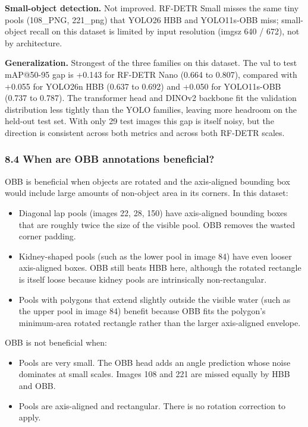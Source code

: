 \documentclass[11pt
]{article}
\providecommand{\tightlist}{%
  \setlength{\itemsep}{0pt}\setlength{\parskip}{0pt}}
\begin{document}
\textbf{Small-object detection.} Not improved. RF-DETR Small misses the
same tiny pools (108\_PNG, 221\_png) that YOLO26 HBB and YOLO11s-OBB
miss; small-object recall on this dataset is limited by input resolution
(imgsz 640 / 672), not by architecture.

\textbf{Generalization.} Strongest of the three families on this
dataset. The val to test mAP@50-95 gap is +0.143 for RF-DETR Nano (0.664
to 0.807), compared with +0.055 for YOLO26n HBB (0.637 to 0.692) and
+0.050 for YOLO11s-OBB (0.737 to 0.787). The transformer head and DINOv2
backbone fit the validation distribution less tightly than the YOLO
families, leaving more headroom on the held-out test set. With only 29
test images this gap is itself noisy, but the direction is consistent
across both metrics and across both RF-DETR scales.

\subsubsection{8.4 When are OBB annotations
beneficial?}\label{when-are-obb-annotations-beneficial}

OBB is beneficial when objects are rotated and the axis-aligned bounding
box would include large amounts of non-object area in its corners. In
this dataset:

\begin{itemize}
\tightlist
\item
  Diagonal lap pools (images 22, 28, 150) have axis-aligned bounding
  boxes that are roughly twice the size of the visible pool. OBB removes
  the wasted corner padding.
\item
  Kidney-shaped pools (such as the lower pool in image 84) have even
  looser axis-aligned boxes. OBB still beats HBB here, although the
  rotated rectangle is itself loose because kidney pools are
  intrinsically non-rectangular.
\item
  Pools with polygons that extend slightly outside the visible water
  (such as the upper pool in image 84) benefit because OBB fits the
  polygon's minimum-area rotated rectangle rather than the larger
  axis-aligned envelope.
\end{itemize}

OBB is not beneficial when:

\begin{itemize}
\tightlist
\item
  Pools are very small. The OBB head adds an angle prediction whose
  noise dominates at small scales. Images 108 and 221 are missed equally
  by HBB and OBB.
\item
  Pools are axis-aligned and rectangular. There is no rotation
  correction to apply.
\end{itemize}
\end{document}
